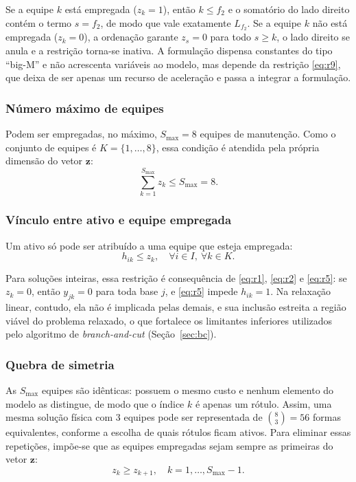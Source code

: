 \documentclass[conference]{IEEEtran}
\begin{document}
Se a equipe $k$ está empregada ($z_k = 1$), então $k \le f_2$ e o somatório do lado direito contém o termo $s = f_2$, de modo que vale exatamente $L_{f_2}$. Se a equipe $k$ não está empregada ($z_k = 0$), a ordenação garante $z_s = 0$ para todo $s \ge k$, o lado direito se anula e a restrição torna-se inativa. A formulação dispensa constantes do tipo ``big-M'' e não acrescenta variáveis ao modelo, mas depende da restrição \eqref{eq:r9}, que deixa de ser apenas um recurso de aceleração e passa a integrar a formulação.

\subsubsection{Número máximo de equipes}
Podem ser empregadas, no máximo, $S_{\max} = 8$ equipes de manutenção. Como o conjunto de equipes é $K = \{1,\dots,8\}$, essa condição é atendida pela própria dimensão do vetor $\mathbf{z}$:
\begin{equation}
\sum_{k=1}^{S_{\max}} z_k \le S_{\max} = 8.
\label{eq:r7}
\end{equation}

\subsubsection{Vínculo entre ativo e equipe empregada}
Um ativo só pode ser atribuído a uma equipe que esteja empregada:
\begin{equation}
h_{ik} \le z_k, \quad \forall i \in I,\ \forall k \in K.
\label{eq:r8}
\end{equation}

Para soluções inteiras, essa restrição é consequência de \eqref{eq:r1}, \eqref{eq:r2} e \eqref{eq:r5}: se $z_k = 0$, então $y_{jk} = 0$ para toda base $j$, e \eqref{eq:r5} impede $h_{ik} = 1$. Na relaxação linear, contudo, ela não é implicada pelas demais, e sua inclusão estreita a região viável do problema relaxado, o que fortalece os limitantes inferiores utilizados pelo algoritmo de \textit{branch-and-cut} (Seção~\ref{sec:bc}).

\subsubsection{Quebra de simetria}
As $S_{\max}$ equipes são idênticas: possuem o mesmo custo e nenhum elemento do modelo as distingue, de modo que o índice $k$ é apenas um rótulo. Assim, uma mesma solução física com 3 equipes pode ser representada de $\binom{8}{3} = 56$ formas equivalentes, conforme a escolha de quais rótulos ficam ativos. Para eliminar essas repetições, impõe-se que as equipes empregadas sejam sempre as primeiras do vetor $\mathbf{z}$:
\begin{equation}
z_k \ge z_{k+1}, \quad k = 1,\dots,S_{\max}-1.
\label{eq:r9}
\end{equation}
\end{document}
